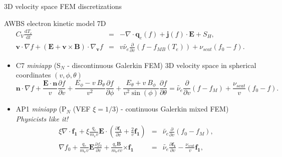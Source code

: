 \documentclass[8pt, compress]{beamer}
\newcommand{\pdv}[2]{\frac{\partial{#1}}{\partial{#2}}}
\newcommand{\vect}[1]{\boldsymbol{#1}}
\newcommand{\dI}{\text{d}}
\newcommand{\nue}{\nu_{e}}
\newcommand{\nuei}{\nu_{ei}}
\newcommand{\nuscat}{\nu_{scat}}
\newcommand{\vmag}{v}
\newcommand{\vn}{\vect{n}}
\newcommand{\E}{\vect{E}}
\newcommand{\B}{\vect{B}}
\newcommand{\qe}{q_e}
\newcommand{\me}{m_e}
\newcommand{\fM}{f_M}
\newcommand{\fzero}{f_0}
\newcommand{\fone}{{\vect{f_1}}}
\begin{document}
\begin{frame}
\begin{center}
{\Large 3D velocity space FEM discretizations}
\begin{myNblock}{AWBS electron kinetic model 7D}
\begin{eqnarray}
  C_V \frac{\dI T_e}{\dI t} 
  &=& 
  - \nabla\cdot\vect{q}_e(f) 
  + \vect{j}(f)\cdot\E
  + S_H , 
  \nonumber \\
  \vect{v}\cdot\nabla f +
  \left( \vect{E} + \vect{v}\times\vect{B}\right)\cdot\nabla_{\vect{v}} f
  &=& 
  v \tilde{\nue} \frac{\partial }{\partial v}\left(f - f_{MB}(T_e)\right)
  + \nuscat \left(\fzero - f \right) .
  \nonumber
\end{eqnarray}
\end{myNblock}
\begin{itemize}
    \item C7 \textit{miniapp} (S$_N$ - discontinuous Galerkin FEM) 3D velocity space in spherical coordinates $(\vmag, \phi, \theta)$
\begin{equation}
  \vn\cdot\nabla f + \frac{\E\cdot\vn}{\vmag} \pdv{f}{\vmag} 
  + \frac{E_\phi 
  - \vmag~B_\theta}{\vmag^2}\pdv{f}{\phi}
  + \frac{E_\theta + \vmag~B_\phi}
  {\vmag^2\sin(\phi)}\pdv{f}{\theta}
  = 
  \tilde{\nue} \frac{\partial }{\partial v}\left(f -\fM\right)
  + \frac{\nuscat}{\vmag} \left(\fzero - f \right) .
  \nonumber
\end{equation}

  \item AP1 \textit{miniapp} (P$_N$ (VEF $\xi=1/3$) - continuous Galerkin mixed FEM)  
      \it{Physicists like it!}
\begin{eqnarray}
  \xi\nabla\cdot\fone + \xi\frac{\qe}{\me\vmag}\E\cdot\left(
  \pdv{\fone}{\vmag} + \frac{2}{\vmag}\fone\right)
  &=& \tilde{\nue}\pdv{}{\vmag}\left(\fzero - \fM \right) , 
  \nonumber \\
  \nabla\fzero + 
  \frac{\qe}{\me\vmag}\E\pdv{\fzero}{\vmag} 
  +\frac{\qe\B}{\me c \vmag}\vect{\times} \fone
  &=& \tilde{\nue}\pdv{\fone}{\vmag}
  - \frac{\nuscat}{\vmag}\fone 
  ,
  \nonumber \label{eq:AP1f1}
\end{eqnarray}

\end{itemize}
\end{center}
\end{frame}
\end{document}
